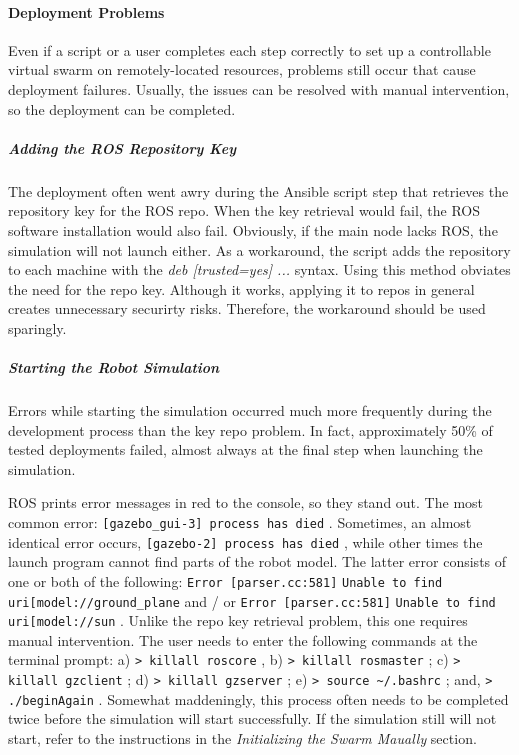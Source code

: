 \documentclass[9pt,twocolumn,twoside]{../../styles/osajnl}
\begin{document}
\paragraph{Deployment Problems}
Even if a script or a user completes each step correctly to set up a controllable virtual swarm on remotely-located resources, problems still occur that cause deployment failures.  Usually, the issues can be resolved with manual intervention, so the deployment can be completed.  

\subparagraph{Adding the ROS Repository Key}
The deployment often went awry during the Ansible script step that retrieves the repository key for the ROS repo.  When the key retrieval would fail, the ROS software installation would also fail.  Obviously, if the main node lacks ROS, the simulation will not launch either.  As a workaround, the script adds the repository to each machine with the \textit{deb [trusted=yes] ...} syntax.  Using this method obviates the need for the repo key.  Although it works, applying it to repos in general creates unnecessary securirty risks.  Therefore, the workaround should be used sparingly.  

\subparagraph{Starting the Robot Simulation}
Errors while starting the simulation occurred much more frequently during the development process than the key repo problem.  In fact, approximately 50\% of tested deployments failed, almost always at the final step when launching the simulation.  

ROS prints error messages in red to the console, so they stand out.  The most common error: {\color{red} \lstinline[style=BashInputStyle]![gazebo_gui-3] process has died! }.  Sometimes, an almost identical error occurs, {\color{red} \lstinline[style=BashInputStyle]![gazebo-2] process has died! }, while other times the launch program cannot find parts of the robot model.  The latter error consists of one or both of the following: {\color{red} \lstinline[style=BashInputStyle]!Error [parser.cc:581]! }{\lstinline[style=BashInputStyle]!Unable to find uri[model://ground_plane! } and / or {\color{red} \lstinline[style=BashInputStyle]!Error [parser.cc:581]! }{\lstinline[style=BashInputStyle]!Unable to find uri[model://sun! }.  Unlike the repo key retrieval problem, this one requires manual intervention.  The user needs to enter the following commands at the terminal prompt: a) {\color{green} \lstinline[style=BashInputStyle]!> killall roscore! }, b) {\color{green} \lstinline[style=BashInputStyle]!> killall rosmaster! }; c) {\color{green} \lstinline[style=BashInputStyle]!> killall gzclient! }; d) {\color{green} \lstinline[style=BashInputStyle]!> killall gzserver! }; e) {\color{green} \lstinline[style=BashInputStyle]!> source ~/.bashrc! }; and, {\color{green} \lstinline[style=BashInputStyle]!> ./beginAgain! }. Somewhat maddeningly, this process often needs to be completed twice before the simulation will start successfully.  If the simulation still will not start, refer to the instructions in the \textit{Initializing the Swarm Maually} section.
\end{document}
